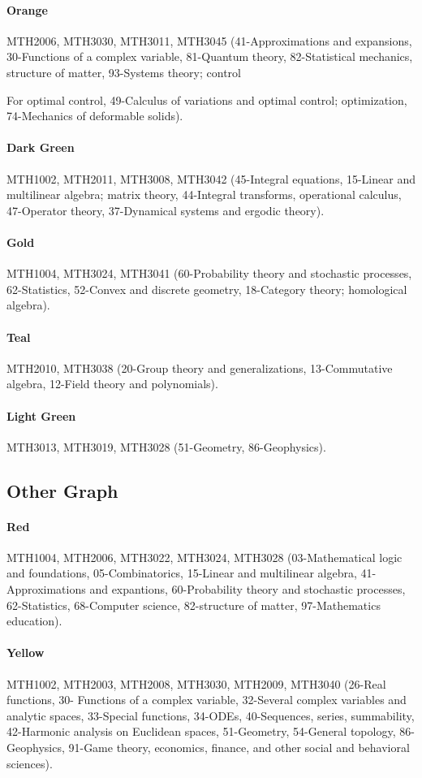 \documentclass[english, 12pt]{article}
\begin{document}
\paragraph{Orange} MTH2006, MTH3030, MTH3011, MTH3045 (41-Approximations and expansions, 30-Functions of a complex variable, 81-Quantum theory, 82-Statistical mechanics, structure of matter, 93-Systems theory; control {For optimal control, 49-Calculus of variations and optimal control; optimization, 74-Mechanics of deformable solids).
\paragraph{Dark Green} MTH1002, MTH2011, MTH3008, MTH3042 (45-Integral equations, 15-Linear and multilinear algebra; matrix theory, 44-Integral transforms, operational calculus, 47-Operator theory, 37-Dynamical systems and ergodic theory).
\paragraph{Gold} MTH1004, MTH3024, MTH3041 (60-Probability theory and stochastic processes, 62-Statistics, 52-Convex and discrete geometry, 18-Category theory; homological algebra).
\paragraph{Teal} MTH2010, MTH3038 (20-Group theory and generalizations, 13-Commutative algebra, 12-Field theory and polynomials).
\paragraph{Light Green} MTH3013, MTH3019, MTH3028 (51-Geometry, 86-Geophysics).
\parskip=0.0pt

\subsection{Other Graph} \label{app:other_graph_communities}
\paragraph{Red} MTH1004, MTH2006, MTH3022, MTH3024, MTH3028 (03-Mathematical logic and foundations, 05-Combinatorics, 15-Linear and multilinear algebra, 41-Approximations and expantions, 60-Probability theory and stochastic processes, 62-Statistics, 68-Computer science, 82-structure of matter, 97-Mathematics education).
\parskip=-16.0pt
\paragraph{Yellow} MTH1002, MTH2003, MTH2008, MTH3030, MTH2009, MTH3040 (26-Real functions, 30- 	Functions of a complex variable, 32-Several complex variables and analytic spaces, 33-Special functions, 34-ODEs, 40-Sequences, series, summability, 42-Harmonic analysis on Euclidean spaces, 51-Geometry, 54-General topology, 86-Geophysics, 91-Game theory, economics, finance, and other social and behavioral sciences).
}
\end{document}

